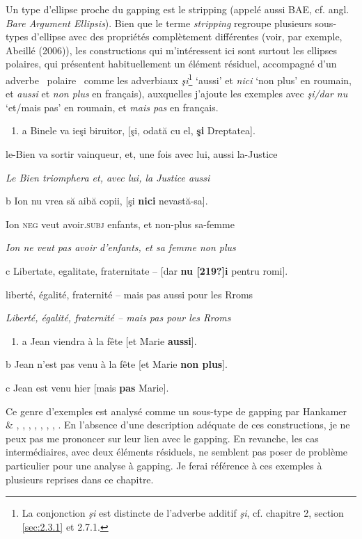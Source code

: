 Un type d'ellipse proche du gapping est le stripping (appelé aussi BAE, cf. angl. \textit{Bare Argument Ellipsis}). Bien que le terme \textit{stripping} regroupe plusieurs sous-types d'ellipse avec des propriétés complètement différentes (voir, par exemple, Abeillé (2006)), les constructions qui m'intéressent ici sont surtout les ellipses polaires, qui présentent habituellement un élément résiduel, accompagné d'un adverbe {\guillemotleft}~polaire~{\guillemotright} comme les adverbiaux \textit{şi}\footnote{La conjonction \textit{şi} est distincte de l'adverbe additif \textit{şi}, cf. chapitre 2, section \ref{sec:2.3.1} et 2.7.1.} `aussi' et \textit{nici} `non plus' en roumain, et\textit{ aussi} et\textit{ non plus} en français), auxquelles j'ajoute les exemples avec \textit{şi/dar nu} `et/mais pas' en roumain, et \textit{mais pas} en français. 


\begin{enumerate}
\item a  Binele va ieşi biruitor, [şi, odată cu el, \textbf{şi} Dreptatea].


\end{enumerate}
le-Bien va sortir vainqueur, et, une fois avec lui, aussi la-Justice 

{\itshape
Le Bien triomphera et, avec lui, la Justice aussi  } 

  b  Ion nu vrea să aibă copii, [şi \textbf{nici} nevastă-sa].

Ion \textsc{neg} veut avoir.\textsc{subj} enfants, et non-plus sa-femme

{\itshape
Ion ne veut pas avoir d'enfants, et sa femme non plus     } 

  c  Libertate, egalitate, fraternitate -- [dar \textbf{nu [219?]i} pentru romi].

liberté, égalité, fraternité -- mais pas aussi pour les Rroms

{\itshape
Liberté, égalité, fraternité -- mais pas pour les Rroms}


\begin{enumerate}
\item a   Jean viendra à la fête [et Marie \textbf{aussi}].  


\end{enumerate}
  b  Jean n'est pas venu à la fête [et Marie \textbf{non plus}].

  c  Jean est venu hier [mais \textbf{pas} Marie].

Ce genre d'exemples est analysé comme un sous-type de gapping par Hankamer \& \citet{Sag1976}, \citet{Williams1977}, \citet{Chao1988}, \citet{Gardent1991}, \citet{Lobeck1995}, \citet{Hendriks1995}, \citet{Hartmann2000}, \citet{Toosarvandani2011}. En l'absence d'une description adéquate de ces constructions, je ne peux pas me prononcer sur leur lien avec le gapping. En revanche, les cas intermédiaires, avec deux éléments résiduels, ne semblent pas poser de problème particulier pour une analyse à gapping. Je ferai référence à ces exemples à plusieurs reprises dans ce chapitre.


